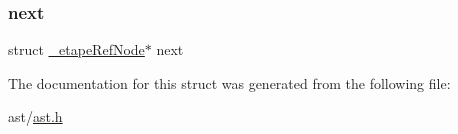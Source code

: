 \mbox{\label{struct__etape_ref_node_a7af4a14b465f82d65763ae5982a22dce}} 
\subsubsection{\texorpdfstring{next}{next}}
{\footnotesize\ttfamily struct \hyperlink{struct__etape_ref_node}{\+\_\+etape\+Ref\+Node}$\ast$ next}



The documentation for this struct was generated from the following file\+:\begin{DoxyCompactItemize}
\item 
ast/\hyperlink{ast_8h}{ast.\+h}\end{DoxyCompactItemize}

